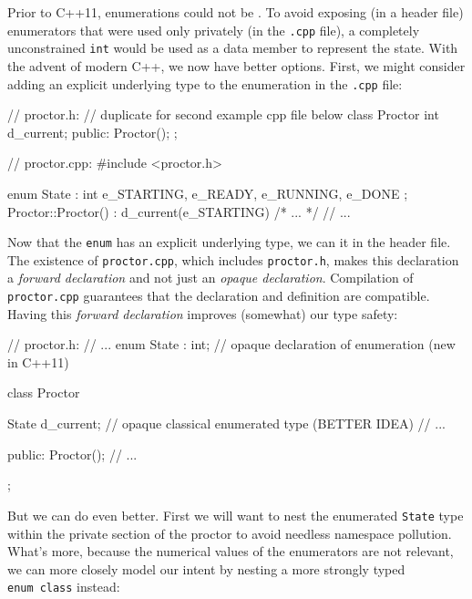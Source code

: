 \noindent Prior to C++11, enumerations could not be . To
avoid exposing (in a header file) enumerators that were used only
privately (in the \lstinline!.cpp! file), a completely unconstrained
\lstinline!int! would be used as a data member to represent the state. With
the advent of modern C++, we now have better options. First, we might
consider adding an explicit underlying type to the enumeration in the
\lstinline!.cpp! file:

\begin{emcppshiddenlisting}[emcppsbatch=e3]
// proctor.h:
// duplicate for second example cpp file below
class Proctor
{
    int d_current;
public:
    Proctor();
};
\end{emcppshiddenlisting}
\begin{emcppslisting}[emcppsbatch=e3]
// proctor.cpp:
#include <proctor.h>

enum State : int { e_STARTING, e_READY, e_RUNNING, e_DONE };
Proctor::Proctor() : d_current(e_STARTING) { /* ... */ }
// ...
\end{emcppslisting}

\noindent Now that the  \lstinline!enum! has an explicit
underlying type, we can  it in the header file.
The existence of \lstinline!proctor.cpp!, which includes
\lstinline!proctor.h!, makes this declaration a \emph{forward declaration}
and not just an \emph{opaque declaration}. Compilation of
\lstinline!proctor.cpp! guarantees that the declaration and definition are
compatible. Having this \emph{forward declaration} improves (somewhat)
our type safety:

\begin{emcppslisting}[emcppsbatch=e4]
// proctor.h:
// ...
enum State : int;  // opaque declaration of enumeration (new in C++11)

class Proctor
{
    State d_current;  // opaque classical enumerated type (BETTER IDEA)
    // ...

public:
    Proctor();
    // ...
};
\end{emcppslisting}

\noindent But we can do even better. First we will want to nest the enumerated
\lstinline!State! type within the private section of the proctor to avoid
needless namespace pollution. What's more, because the numerical values
of the enumerators are not relevant, we can more closely model our
intent by nesting a more strongly typed \lstinline!enum!~\lstinline!class! instead:

